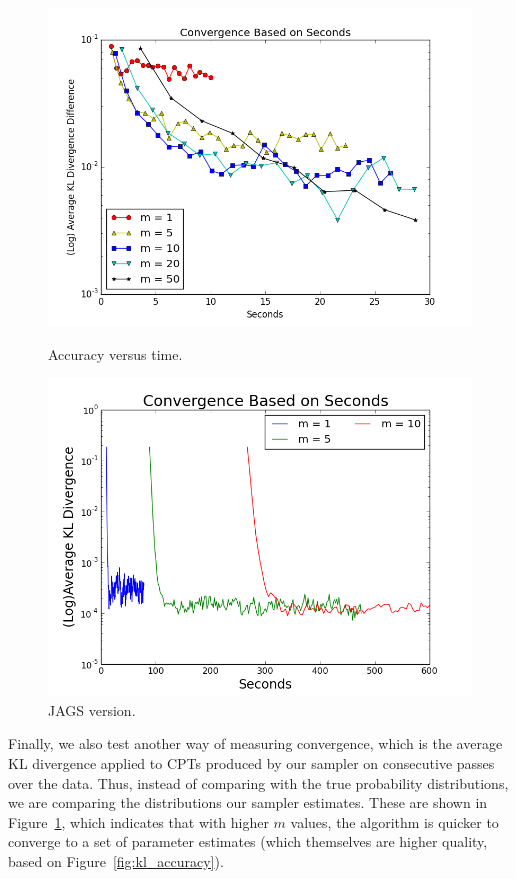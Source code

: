 \documentclass{article} %
\begin{document}
\begin{figure}[t]
  \centering
  \begin{minipage}{.5\textwidth}
    \centering
    \includegraphics[width=1\textwidth]{fig_kl_time_log}
    \caption{Accuracy versus time.}
    \label{fig:kl_time}
  \end{minipage}\hfill
    \begin{minipage}{.5\textwidth}
    \centering
    \includegraphics[width=1\textwidth]{fig_kl_div_25_50_perc_jags_time}
    \caption{JAGS version.}
    \label{fig:consecutive_cpts}
  \end{minipage}
\end{figure}

Finally, we also test another way of measuring convergence, which is the average KL divergence
applied to CPTs produced by our sampler on consecutive passes over the data. Thus, instead of
comparing with the true probability distributions, we are comparing the distributions our sampler
estimates. These are shown in Figure~\ref{fig:consecutive_cpts}, which indicates that with higher
$m$ values, the algorithm is quicker to converge to a set of parameter estimates (which themselves
are higher quality, based on Figure~\ref{fig:kl_accuracy}).
\end{document}
